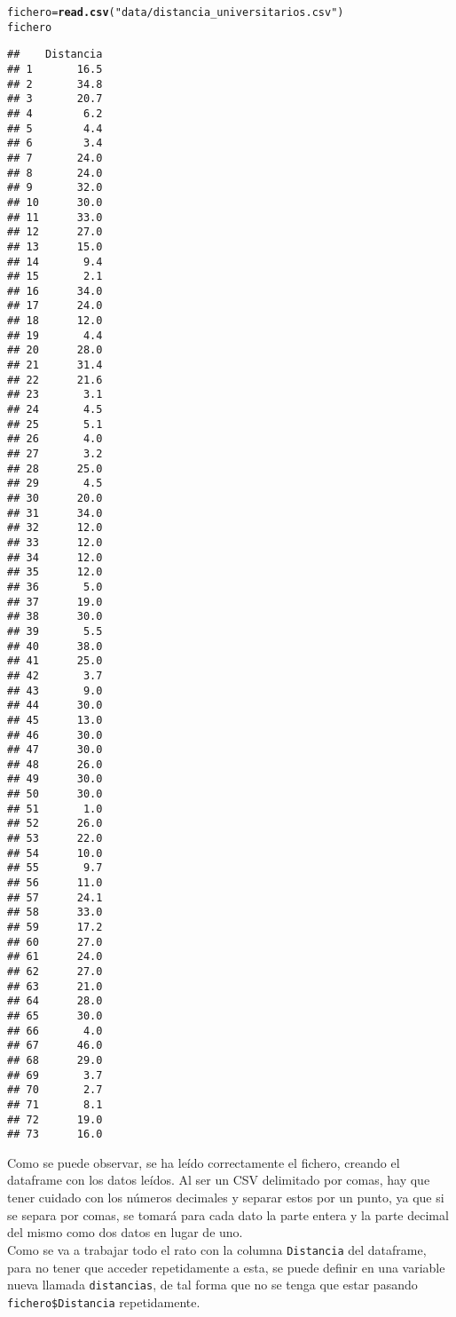 \documentclass[12pt]{report}\usepackage[]{graphicx}\usepackage[dvipsnames]{xcolor}
\makeatletter
\newcommand{\hlstr}[1]{\textcolor[rgb]{0.192,0.494,0.8}{#1}}%
\newcommand{\hlstd}[1]{\textcolor[rgb]{0.345,0.345,0.345}{#1}}%
\newcommand{\hlkwb}[1]{\textcolor[rgb]{0.69,0.353,0.396}{#1}}%
\newcommand{\hlkwd}[1]{\textcolor[rgb]{0.737,0.353,0.396}{\textbf{#1}}}%
\newenvironment{kframe}{%
 \def\at@end@of@kframe{}%
 \ifinner\ifhmode%
  \def\at@end@of@kframe{\end{minipage}}%
  \begin{minipage}{\columnwidth}%
 \fi\fi%
 \def\FrameCommand##1{\hskip\@totalleftmargin \hskip-\fboxsep
 \colorbox{shadecolor}{##1}\hskip-\fboxsep
     \hskip-\linewidth \hskip-\@totalleftmargin \hskip\columnwidth}%
 \MakeFramed {\advance\hsize-\width
   \@totalleftmargin\z@ \linewidth\hsize
   \@setminipage}}%
 {\par\unskip\endMakeFramed%
 \at@end@of@kframe}
\newenvironment{knitrout}{}{} %
\makeatother
\begin{document}
\begin{knitrout}
\color{fgcolor}\begin{kframe}
\begin{alltt}
\hlstd{fichero} \hlkwb{=} \hlkwd{read.csv}\hlstd{(}\hlstr{"data/distancia_universitarios.csv"}\hlstd{)}
\hlstd{fichero}
\end{alltt}
\begin{verbatim}
##    Distancia
## 1       16.5
## 2       34.8
## 3       20.7
## 4        6.2
## 5        4.4
## 6        3.4
## 7       24.0
## 8       24.0
## 9       32.0
## 10      30.0
## 11      33.0
## 12      27.0
## 13      15.0
## 14       9.4
## 15       2.1
## 16      34.0
## 17      24.0
## 18      12.0
## 19       4.4
## 20      28.0
## 21      31.4
## 22      21.6
## 23       3.1
## 24       4.5
## 25       5.1
## 26       4.0
## 27       3.2
## 28      25.0
## 29       4.5
## 30      20.0
## 31      34.0
## 32      12.0
## 33      12.0
## 34      12.0
## 35      12.0
## 36       5.0
## 37      19.0
## 38      30.0
## 39       5.5
## 40      38.0
## 41      25.0
## 42       3.7
## 43       9.0
## 44      30.0
## 45      13.0
## 46      30.0
## 47      30.0
## 48      26.0
## 49      30.0
## 50      30.0
## 51       1.0
## 52      26.0
## 53      22.0
## 54      10.0
## 55       9.7
## 56      11.0
## 57      24.1
## 58      33.0
## 59      17.2
## 60      27.0
## 61      24.0
## 62      27.0
## 63      21.0
## 64      28.0
## 65      30.0
## 66       4.0
## 67      46.0
## 68      29.0
## 69       3.7
## 70       2.7
## 71       8.1
## 72      19.0
## 73      16.0
\end{verbatim}
\end{kframe}
\end{knitrout}
			
			Como se puede observar, se ha leído correctamente el fichero, creando el dataframe con los datos leídos. Al ser un CSV delimitado por comas, hay que tener cuidado con los números decimales y separar estos por un punto, ya que si se separa por comas, se tomará para cada dato la parte entera y la parte decimal del mismo como dos datos en lugar de uno.\\ 
			
			Como se va a trabajar todo el rato con la columna \texttt{Distancia} del dataframe, para no tener que acceder repetidamente a esta, se puede definir en una variable nueva llamada \texttt{distancias}, de tal forma que no se tenga que estar pasando \texttt{fichero\$Distancia} repetidamente.
			
\end{document}
